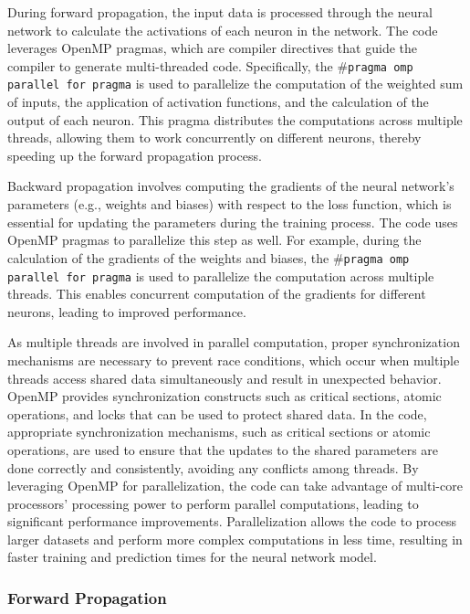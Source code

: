 \documentclass[11pt]{article}
\begin{document}
\bigskip 

During forward propagation, the input data is processed through the neural network to calculate the activations of each neuron in the network. The code leverages OpenMP pragmas, which are compiler directives that guide the compiler to generate multi-threaded code. Specifically, the \#\texttt{pragma omp parallel for pragma} is used to parallelize the computation of the weighted sum of inputs, the application of activation functions, and the calculation of the output of each neuron. This pragma distributes the computations across multiple threads, allowing them to work concurrently on different neurons, thereby speeding up the forward propagation process.

\bigskip

Backward propagation involves computing the gradients of the neural network's parameters (e.g., weights and biases) with respect to the loss function, which is essential for updating the parameters during the training process. The code uses OpenMP pragmas to parallelize this step as well. For example, during the calculation of the gradients of the weights and biases, the \#\texttt{pragma omp parallel for pragma} is used to parallelize the computation across multiple threads. This enables concurrent computation of the gradients for different neurons, leading to improved performance.

\bigskip

As multiple threads are involved in parallel computation, proper synchronization mechanisms are necessary to prevent race conditions, which occur when multiple threads access shared data simultaneously and result in unexpected behavior. OpenMP provides synchronization constructs such as critical sections, atomic operations, and locks that can be used to protect shared data. In the code, appropriate synchronization mechanisms, such as critical sections or atomic operations, are used to ensure that the updates to the shared parameters are done correctly and consistently, avoiding any conflicts among threads. By leveraging OpenMP for parallelization, the code can take advantage of multi-core processors' processing power to perform parallel computations, leading to significant performance improvements. Parallelization allows the code to process larger datasets and perform more complex computations in less time, resulting in faster training and prediction times for the neural network model. 



\subsubsection{Forward Propagation}
\end{document}
